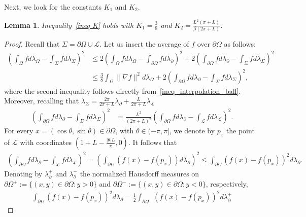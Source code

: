 \documentclass[a4paper]{article}
\newtheorem{lemma}[theorem]{Lemma}
\theoremstyle{definition}
\numberwithin{equation}{section}
\begin{document}
Next, we look for the constants $K_1$ and $K_2$.

\begin{lemma}
Inequality~\eqref{ineq K} holds with $K_1=\frac{3}{8}$ and $K_2=\frac{L^2(\pi+L)}{\beta(2\pi + L)}$. 
\end{lemma}

\begin{proof}
Recall that $\Sigma=\partial \Omega \cup \mathcal L$. 
Let us insert the average of $f$ over $\partial \Omega$ as follows:
\begin{align*}
\left( \int_\Omega f d \lambda_\Omega - \int_\Sigma f d \lambda_\Sigma \right)^2
&\leq
2 \left( \int_\Omega f d \lambda_\Omega - \int_{\partial \Omega} f d \lambda_\partial \right)^2
+ 2 \left( \int_{\partial \Omega} f d \lambda_\partial - \int_\Sigma f d \lambda_\Sigma \right)^2 \\
&\leq \frac{3}{8} \int_\Omega \| \nabla f \|^2 d\lambda_\Omega
+ 2 \left( \int_{\partial \Omega} f d \lambda_\partial - \int_\Sigma f d \lambda_\Sigma \right)^2,
\end{align*}
where the second inequality follows directly from~\eqref{ineq_interpolation_ball}. 
Moreover, recalling that $\lambda_\Sigma=\frac{2 \pi}{2 \pi+L} \lambda_\partial + \frac{L}{2\pi +L} \lambda_\mathcal L$
\begin{align*}
\left( \int_{\partial \Omega} f d \lambda_\partial - \int_\Sigma f d \lambda_\Sigma \right)^2
 &=  \frac{L^2}{(2\pi +L)^2} \left( \int_{\partial \Omega} f d \lambda_\partial - \int_{\mathcal L} f d \lambda_\mathcal L \right)^2 .
\end{align*}
For every $x=(\cos\theta, \sin \theta) \in \partial \Omega$, with $\theta \in (-\pi,\pi]$, we denote by $p_x$ the point of $\mathcal L$ with coordinates $(1+L -\frac{|\theta| L}{\pi},0)$. It follows that
\begin{align*}
\left( \int_{\partial \Omega} f d \lambda_\partial - \int_{\mathcal L} f d \lambda_\mathcal L \right)^2 
= \left( \int_{\partial \Omega} (f(x)-f(p_x)) d \lambda_\partial  \right)^2 
\leq \int_{\partial \Omega} (f(x)-f(p_x))^2 d \lambda_\partial . 
\end{align*}
Denoting by $\lambda_\partial^+$ and $\lambda_\partial^-$  the normalized Hausdorff measures on $\partial \Omega^+:=  \{(x,y) \in \partial \Omega:  y>0\}$ and $\partial \Omega^-:=  \{(x,y) \in \partial \Omega:  y<0\}$, respectively, 
\begin{align*}
 \int_{\partial \Omega} (f(x)-f(p_x))^2 d \lambda_\partial 
 = \frac{1}{2}   \int_{\partial \Omega^+} (f(x)-f(p_x))^2 d \lambda^+_\partial 

\end{align*}
\end{proof}
\end{document}
